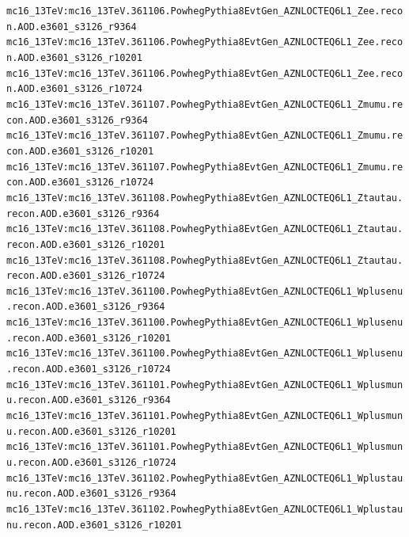\fontsize{0.3cm}{0.3cm}\texttt{mc16\_13TeV:mc16\_13TeV.361106.PowhegPythia8EvtGen\_AZNLOCTEQ6L1\_Zee.recon.AOD.e3601\_s3126\_r9364\newline   
 mc16\_13TeV:mc16\_13TeV.361106.PowhegPythia8EvtGen\_AZNLOCTEQ6L1\_Zee.recon.AOD.e3601\_s3126\_r10201\newline   
 mc16\_13TeV:mc16\_13TeV.361106.PowhegPythia8EvtGen\_AZNLOCTEQ6L1\_Zee.recon.AOD.e3601\_s3126\_r10724\newline   
 mc16\_13TeV:mc16\_13TeV.361107.PowhegPythia8EvtGen\_AZNLOCTEQ6L1\_Zmumu.recon.AOD.e3601\_s3126\_r9364\newline   
 mc16\_13TeV:mc16\_13TeV.361107.PowhegPythia8EvtGen\_AZNLOCTEQ6L1\_Zmumu.recon.AOD.e3601\_s3126\_r10201\newline    
 mc16\_13TeV:mc16\_13TeV.361107.PowhegPythia8EvtGen\_AZNLOCTEQ6L1\_Zmumu.recon.AOD.e3601\_s3126\_r10724\newline    
 mc16\_13TeV:mc16\_13TeV.361108.PowhegPythia8EvtGen\_AZNLOCTEQ6L1\_Ztautau.recon.AOD.e3601\_s3126\_r9364\newline    
 mc16\_13TeV:mc16\_13TeV.361108.PowhegPythia8EvtGen\_AZNLOCTEQ6L1\_Ztautau.recon.AOD.e3601\_s3126\_r10201\newline    
 mc16\_13TeV:mc16\_13TeV.361108.PowhegPythia8EvtGen\_AZNLOCTEQ6L1\_Ztautau.recon.AOD.e3601\_s3126\_r10724\newline    
 mc16\_13TeV:mc16\_13TeV.361100.PowhegPythia8EvtGen\_AZNLOCTEQ6L1\_Wplusenu.recon.AOD.e3601\_s3126\_r9364\newline    
 mc16\_13TeV:mc16\_13TeV.361100.PowhegPythia8EvtGen\_AZNLOCTEQ6L1\_Wplusenu.recon.AOD.e3601\_s3126\_r10201\newline    
 mc16\_13TeV:mc16\_13TeV.361100.PowhegPythia8EvtGen\_AZNLOCTEQ6L1\_Wplusenu.recon.AOD.e3601\_s3126\_r10724\newline    
 mc16\_13TeV:mc16\_13TeV.361101.PowhegPythia8EvtGen\_AZNLOCTEQ6L1\_Wplusmunu.recon.AOD.e3601\_s3126\_r9364\newline    
 mc16\_13TeV:mc16\_13TeV.361101.PowhegPythia8EvtGen\_AZNLOCTEQ6L1\_Wplusmunu.recon.AOD.e3601\_s3126\_r10201\newline    
 mc16\_13TeV:mc16\_13TeV.361101.PowhegPythia8EvtGen\_AZNLOCTEQ6L1\_Wplusmunu.recon.AOD.e3601\_s3126\_r10724\newline    
 mc16\_13TeV:mc16\_13TeV.361102.PowhegPythia8EvtGen\_AZNLOCTEQ6L1\_Wplustaunu.recon.AOD.e3601\_s3126\_r9364\newline    
 mc16\_13TeV:mc16\_13TeV.361102.PowhegPythia8EvtGen\_AZNLOCTEQ6L1\_Wplustaunu.recon.AOD.e3601\_s3126\_r10201\newline    
}
